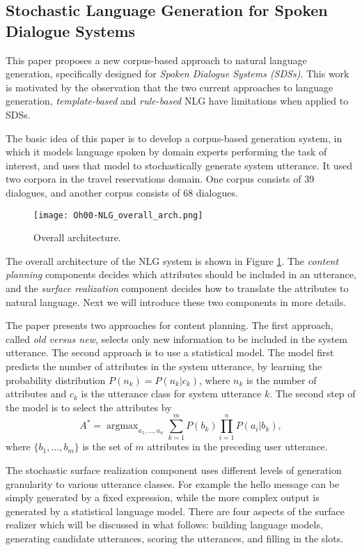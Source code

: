 \subsection{Stochastic Language Generation for Spoken Dialogue Systems \cite{Oh2000}}

This paper proposes a new corpus-based approach to natural language generation, specifically designed for \emph{\emph{Spoken Dialogue Systems (SDSs)}}. This work is motivated by the observation that the two current approaches to language generation, \emph{template-based} and \emph{rule-based} NLG have limitations when applied to SDSs.

The basic idea of this paper is to develop a corpus-based generation system, in which it models language spoken by domain experts performing the task of interest, and uses that model to stochastically generate system utterance. It used two corpora in the travel reservations domain. One corpus consists of 39 dialogues, and another corpus consists of 68 dialogues.

\begin{figure}[h]
  \centering
  \texttt{[image: Oh00-NLG\_overall\_arch.png]}\\
  \caption{Overall architecture.}\label{fig:Oh00-NLG_overall_arch}
\end{figure}

The overall architecture of the NLG system is shown in Figure \ref{fig:Oh00-NLG_overall_arch}. The \emph{content planning} components decides which attributes should be included in an utterance, and the \emph{surface realization} component decides how to translate the attributes to natural language. Next we will introduce these two components in more details.

The paper presents two approaches for content planning. The first approach, called \emph{old versus new}, selects only new information to be included in the system utterance. The second approach is to use a statistical model. The model first predicts the number of attributes in the system utterance, by learning the probability distribution $P(n_k) = P(n_k | c_k)$, where $n_k$ is the number of attributes and $c_k$ is the utterance class for system utterance $k$. The second step of the model is to select the attributes by
$$A^* = \mathop{\arg \max}_{a_1, ..., a_n} \sum_{k=1}^m P(b_k) \prod_{i=1}^n P(a_i | b_k),$$
where $\{b_1, ..., b_m\}$ is the set of $m$ attributes in the preceding user utterance.

The stochastic surface realization component uses different levels of generation granularity to various utterance classes. For example the hello message can be simply generated by a fixed expression, while the more complex output is generated by a statistical language model. There are four aspects of the surface realizer which will be discussed in what follows: building language models, generating candidate utterances, scoring the utterances, and filling in the slots.

